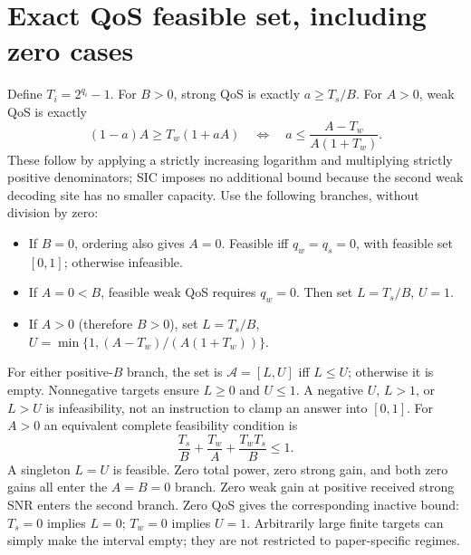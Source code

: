 \documentclass[11pt]{article}
\begin{document}
\section{Exact QoS feasible set, including zero cases}
Define \(T_i=2^{q_i}-1\). For \(B>0\), strong QoS is exactly
\(a\geq T_s/B\). For \(A>0\), weak QoS is exactly
\begin{equation}
 (1-a)A\geq T_w(1+aA)
 \quad\Longleftrightarrow\quad
 a\leq\frac{A-T_w}{A(1+T_w)}.
\end{equation}
These follow by applying a strictly increasing logarithm and multiplying
strictly positive denominators; SIC imposes no additional bound because
the second weak decoding site has no smaller capacity.
Use the following branches, without division by zero:
\begin{itemize}
 \item If \(B=0\), ordering also gives \(A=0\). Feasible iff
 \(q_w=q_s=0\), with feasible set \([0,1]\); otherwise infeasible.
 \item If \(A=0<B\), feasible weak QoS requires \(q_w=0\).
 Then set \(L=T_s/B\), \(U=1\).
 \item If \(A>0\) (therefore \(B>0\)), set
 \(L=T_s/B\), \(U=\min\{1,(A-T_w)/(A(1+T_w))\}\).
\end{itemize}
For either positive-\(B\) branch, the set is \(\mathcal A=[L,U]\)
iff \(L\leq U\); otherwise it is empty. Nonnegative targets ensure
\(L\geq0\) and \(U\leq1\). A negative \(U\), \(L>1\), or
\(L>U\) is infeasibility, not an instruction to clamp an answer into
\([0,1]\). For \(A>0\) an equivalent complete feasibility condition is
\begin{equation}
 \frac{T_s}{B}+\frac{T_w}{A}+\frac{T_wT_s}{B}\leq1.
\end{equation}
A singleton \(L=U\) is feasible. Zero total power, zero strong gain,
and both zero gains all enter the \(A=B=0\) branch. Zero weak gain at
positive received strong SNR enters the second branch. Zero QoS gives
the corresponding inactive bound: \(T_s=0\) implies \(L=0\);
\(T_w=0\) implies \(U=1\). Arbitrarily large finite targets can simply
make the interval empty; they are not restricted to paper-specific regimes.
\end{document}
